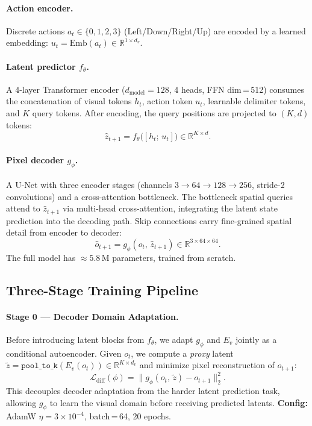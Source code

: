 \documentclass[11pt]{article}
\begin{document}
\paragraph{Action encoder.}
Discrete actions $a_t \in \{0,1,2,3\}$ (Left/Down/Right/Up) are encoded by
a learned embedding:
$u_t = \text{Emb}(a_t) \in \mathbb{R}^{1 \times d_v}$.

\paragraph{Latent predictor $f_\theta$.}
A 4-layer Transformer encoder ($d_\text{model}=128$, 4 heads, FFN dim\,=\,512)
consumes the concatenation of visual tokens $h_t$, action token $u_t$,
learnable delimiter tokens, and $K$ query tokens.
After encoding, the query positions are projected to $(K, d)$ tokens:
\begin{equation}
\hat{z}_{t+1} = f_\theta\bigl([h_t;\, u_t]\bigr) \in \mathbb{R}^{K \times d}.
\end{equation}

\paragraph{Pixel decoder $g_\phi$.}
A U-Net with three encoder stages (channels $3{\to}64{\to}128{\to}256$,
stride-2 convolutions) and a cross-attention bottleneck.
The bottleneck spatial queries attend to $\hat{z}_{t+1}$ via multi-head
cross-attention, integrating the latent state prediction into the decoding path.
Skip connections carry fine-grained spatial detail from encoder to decoder:
\begin{equation}
\hat{o}_{t+1} = g_\phi(o_t,\, \hat{z}_{t+1}) \in \mathbb{R}^{3 \times 64 \times 64}.
\end{equation}
The full model has ${\approx}5.8$\,M parameters, trained from scratch.

\subsection{Three-Stage Training Pipeline}

\paragraph{Stage 0 — Decoder Domain Adaptation.}
Before introducing latent blocks from $f_\theta$, we adapt $g_\phi$ and $E_v$
jointly as a conditional autoencoder.
Given $o_t$, we compute a \emph{proxy} latent
$\tilde{z} = \texttt{pool\_to\_k}(E_v(o_t)) \in \mathbb{R}^{K \times d_v}$
and minimize pixel reconstruction of $o_{t+1}$:
\begin{equation}
\mathcal{L}_\text{diff}(\phi) = \bigl\|g_\phi(o_t,\,\tilde{z}) - o_{t+1}\bigr\|_2^2.
\end{equation}
This decouples decoder adaptation from the harder latent prediction task,
allowing $g_\phi$ to learn the visual domain before receiving predicted latents.
\textbf{Config:} AdamW $\eta=3\times10^{-4}$, batch\,=\,64, 20 epochs.
\end{document}
